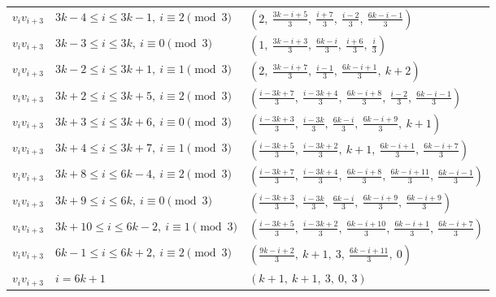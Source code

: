 \begin{longtable}{lll}
$v_i v_{i+3}$ & $3k-4 \le i \le 3k-1,\ i \equiv 2 \pmod{3}$ & $(2,\ \frac{3k-i+5}{3},\ \frac{i+7}{3},\ \frac{i-2}{3},\ \frac{6k-i-1}{3})$ \\
$v_i v_{i+3}$ & $3k-3 \le i \le 3k,\ i \equiv 0 \pmod{3}$ & $(1,\ \frac{3k-i+3}{3},\ \frac{6k-i}{3},\ \frac{i+6}{3},\ \frac{i}{3})$ \\
$v_i v_{i+3}$ & $3k-2 \le i \le 3k+1,\ i \equiv 1 \pmod{3}$ & $(2,\ \frac{3k-i+7}{3},\ \frac{i-1}{3},\ \frac{6k-i+1}{3},\ k+2)$ \\
$v_i v_{i+3}$ & $3k+2 \le i \le 3k+5,\ i \equiv 2 \pmod{3}$ & $(\frac{i-3k+7}{3},\ \frac{i-3k+4}{3},\ \frac{6k-i+8}{3},\ \frac{i-2}{3},\ \frac{6k-i-1}{3})$ \\
$v_i v_{i+3}$ & $3k+3 \le i \le 3k+6,\ i \equiv 0 \pmod{3}$ & $(\frac{i-3k+3}{3},\ \frac{i-3k}{3},\ \frac{6k-i}{3},\ \frac{6k-i+9}{3},\ k+1)$ \\
$v_i v_{i+3}$ & $3k+4 \le i \le 3k+7,\ i \equiv 1 \pmod{3}$ & $(\frac{i-3k+5}{3},\ \frac{i-3k+2}{3},\ k+1,\ \frac{6k-i+1}{3},\ \frac{6k-i+7}{3})$ \\
$v_i v_{i+3}$ & $3k+8 \le i \le 6k-4,\ i \equiv 2 \pmod{3}$ & $(\frac{i-3k+7}{3},\ \frac{i-3k+4}{3},\ \frac{6k-i+8}{3},\ \frac{6k-i+11}{3},\ \frac{6k-i-1}{3})$ \\
$v_i v_{i+3}$ & $3k+9 \le i \le 6k,\ i \equiv 0 \pmod{3}$ & $(\frac{i-3k+3}{3},\ \frac{i-3k}{3},\ \frac{6k-i}{3},\ \frac{6k-i+9}{3},\ \frac{6k-i+9}{3})$ \\
$v_i v_{i+3}$ & $3k+10 \le i \le 6k-2,\ i \equiv 1 \pmod{3}$ & $(\frac{i-3k+5}{3},\ \frac{i-3k+2}{3},\ \frac{6k-i+10}{3},\ \frac{6k-i+1}{3},\ \frac{6k-i+7}{3})$ \\
$v_i v_{i+3}$ & $6k-1 \le i \le 6k+2,\ i \equiv 2 \pmod{3}$ & $(\frac{9k-i+2}{3},\ k+1,\ 3,\ \frac{6k-i+11}{3},\ 0)$ \\
$v_i v_{i+3}$ & $i = 6k+1$ & $(k+1,\ k+1,\ 3,\ 0,\ 3)$ \\
\hline
\end{longtable}
\clearpage
